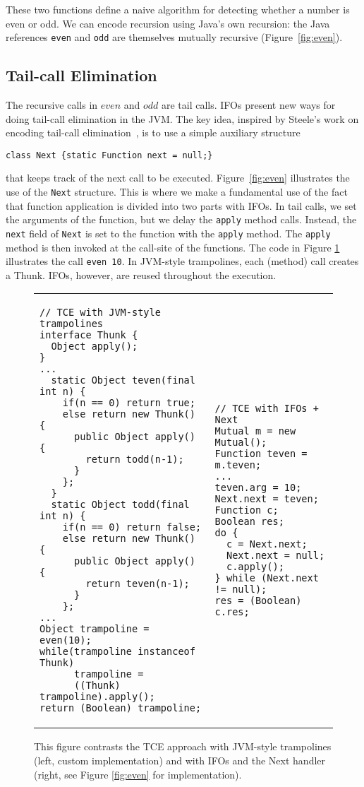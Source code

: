 \noindent These two functions define a naive algorithm for detecting
whether a number is even or odd. We can encode recursion using Java's own
recursion: the Java references \lstinline{even} and
\lstinline{odd} are themselves mutually recursive (Figure~\ref{fig:even}).

\subsection{Tail-call Elimination}

The recursive calls in $even$ and $odd$ are tail calls.
IFOs present new ways for doing tail-call elimination in the JVM.
The key idea, inspired by Steele's work on encoding tail-call
elimination~\cite{Steele1978}, is to use a simple
auxiliary structure
\begin{lstlisting}
class Next {static Function next = null;}
\end{lstlisting}
\noindent that keeps track of the next call to be executed. Figure~\ref{fig:even} illustrates the use of the
\lstinline{Next} structure. This is where we make a fundamental use of the fact
that function application is divided into two parts with IFOs.
In tail calls, we set the arguments of the
function, but we delay the \lstinline{apply} method calls.
Instead, the \lstinline{next} field of \lstinline{Next} is set
to the function with the \lstinline{apply} method. The \lstinline{apply}
method is then invoked at the call-site of the functions. The code in Figure \ref{fig:trampoline} illustrates the call \lstinline{even 10}.
In JVM-style trampolines, each (method) call creates a Thunk. IFOs, however, are reused
throughout the execution.
\begin{figure}[t]
\begin{tabular}[t]{l l}
\begin{lstlisting}
// TCE with JVM-style trampolines
interface Thunk {
  Object apply();
}
...
  static Object teven(final int n) {
    if(n == 0) return true;
    else return new Thunk() {
      public Object apply() {
        return todd(n-1);
      }
    };
  }
  static Object todd(final int n) {
    if(n == 0) return false;
    else return new Thunk() {
      public Object apply() {
        return teven(n-1);
      }
    };
...
Object trampoline = even(10);
while(trampoline instanceof Thunk)
      trampoline =
      ((Thunk) trampoline).apply();
return (Boolean) trampoline;
\end{lstlisting}&
\hspace{10pt}\begin{lstlisting}
// TCE with IFOs + Next
Mutual m = new Mutual();
Function teven = m.teven;
...
teven.arg = 10;
Next.next = teven;
Function c;
Boolean res;
do {
  c = Next.next;
  Next.next = null;
  c.apply();
} while (Next.next != null);
res = (Boolean) c.res;
\end{lstlisting}
\end{tabular}

\caption{This figure contrasts the TCE approach with JVM-style trampolines (left, custom
implementation) and with IFOs and the Next handler (right, see Figure \ref{fig:even} for implementation).}

\label{fig:trampoline}
\vspace{-15pt}
\end{figure}

